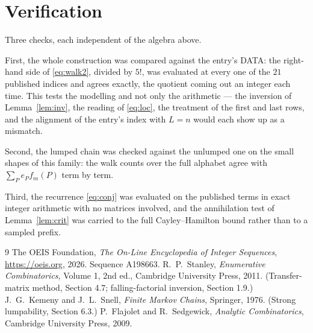\documentclass[11pt,a4paper]{article}
\theoremstyle{plain}
\theoremstyle{definition}
\begin{document}
\section{Verification}

Three checks, each independent of the algebra above.

First, the whole construction was compared against the entry's DATA: the right-hand side of
\eqref{eq:walk2}, divided by $5!$, was evaluated at every one of the $21$
published indices and agrees exactly, the quotient coming out an integer each time. This
tests the modelling and not only the arithmetic --- the inversion of Lemma~\ref{lem:inv},
the reading of \eqref{eq:loc}, the treatment of the first and last rows, and the
alignment of the entry's index with $L=n$ would each show up as a mismatch.

Second, the lumped chain was checked against the unlumped one on the small shapes of this
family: the walk counts over the full alphabet agree with $\sum_P e_Pf_m(P)$ term by term.

Third, the recurrence \eqref{eq:conj} was evaluated on the published terms in exact integer
arithmetic with no matrices involved, and the annihilation test of Lemma~\ref{lem:crit} was
carried to the full Cayley--Hamilton bound rather than to a sampled prefix.

\begin{thebibliography}{9}
 The OEIS Foundation, \emph{The On-Line Encyclopedia of Integer
Sequences}, \url{https://oeis.org}, 2026. Sequence A198663.
 R.~P.~Stanley, \emph{Enumerative Combinatorics}, Volume 1, 2nd ed.,
Cambridge University Press, 2011. (Transfer-matrix method, Section 4.7; falling-factorial
inversion, Section 1.9.)
 J.~G.~Kemeny and J.~L.~Snell, \emph{Finite Markov Chains}, Springer,
1976. (Strong lumpability, Section 6.3.)
 P.~Flajolet and R.~Sedgewick, \emph{Analytic Combinatorics}, Cambridge
University Press, 2009.
\end{thebibliography}
\end{document}
